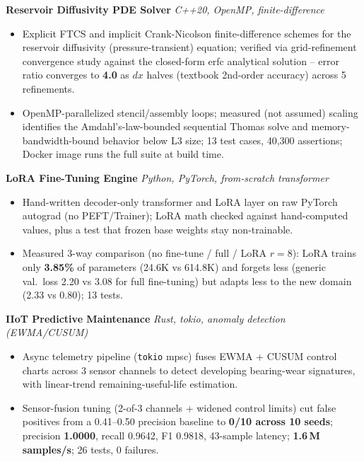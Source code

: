 \documentclass[10pt]{article}
\newcommand{\projectentry}[2]{%
  \noindent\textbf{#1} \hfill \textit{#2}\\[-0.3em]
}
\begin{document}
\projectentry{Reservoir Diffusivity PDE Solver}{C++20, OpenMP, finite-difference}
\begin{itemize}
  \item Explicit FTCS and implicit Crank-Nicolson finite-difference schemes for the reservoir diffusivity (pressure-transient) equation; verified via grid-refinement convergence study against the closed-form erfc analytical solution -- error ratio converges to \textbf{4.0} as $dx$ halves (textbook 2nd-order accuracy) across 5 refinements.
  \item OpenMP-parallelized stencil/assembly loops; measured (not assumed) scaling identifies the Amdahl's-law-bounded sequential Thomas solve and memory-bandwidth-bound behavior below L3 size; 13 test cases, 40{,}300 assertions; Docker image runs the full suite at build time.
\end{itemize}

\projectentry{LoRA Fine-Tuning Engine}{Python, PyTorch, from-scratch transformer}
\begin{itemize}
  \item Hand-written decoder-only transformer and LoRA layer on raw PyTorch autograd (no PEFT/Trainer); LoRA math checked against hand-computed values, plus a test that frozen base weights stay non-trainable.
  \item Measured 3-way comparison (no fine-tune / full / LoRA $r{=}8$): LoRA trains only \textbf{3.85\%} of parameters (24.6K vs 614.8K) and forgets less (generic val.\ loss 2.20 vs 3.08 for full fine-tuning) but adapts less to the new domain (2.33 vs 0.80); 13 tests.
\end{itemize}

\projectentry{IIoT Predictive Maintenance}{Rust, tokio, anomaly detection (EWMA/CUSUM)}
\begin{itemize}
  \item Async telemetry pipeline (\texttt{tokio} mpsc) fuses EWMA + CUSUM control charts across 3 sensor channels to detect developing bearing-wear signatures, with linear-trend remaining-useful-life estimation.
  \item Sensor-fusion tuning (2-of-3 channels + widened control limits) cut false positives from a 0.41--0.50 precision baseline to \textbf{0/10 across 10 seeds}; precision \textbf{1.0000}, recall 0.9642, F1 0.9818, 43-sample latency; \textbf{1.6\,M samples/s}; 26 tests, 0 failures.
\end{itemize}
\end{document}
